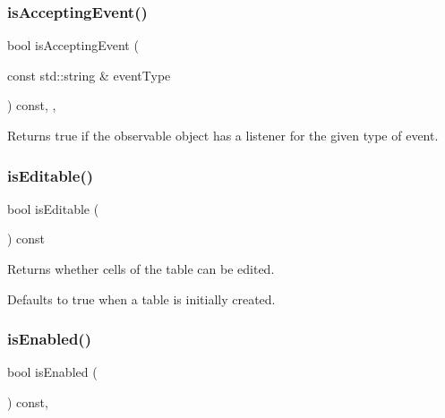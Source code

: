 \subsubsection{\texorpdfstring{is\+Accepting\+Event()}{isAcceptingEvent()}\hspace{0.1cm}{\footnotesize\ttfamily [3/3]}}
{\footnotesize\ttfamily bool is\+Accepting\+Event (\begin{DoxyParamCaption}\item[{const std\+::string \&}]{event\+Type }\end{DoxyParamCaption}) const\hspace{0.3cm}{\ttfamily [protected]}, {\ttfamily [virtual]}, {\ttfamily [inherited]}}



Returns true if the observable object has a listener for the given type of event. 

\mbox{\label{classGTable_a012b5afb54e037e6c5498cf0932a521b}} 
\subsubsection{\texorpdfstring{is\+Editable()}{isEditable()}}
{\footnotesize\ttfamily bool is\+Editable (\begin{DoxyParamCaption}{ }\end{DoxyParamCaption}) const\hspace{0.3cm}{\ttfamily [virtual]}}



Returns whether cells of the table can be edited. 

Defaults to true when a table is initially created. \mbox{\label{classGInteractor_aacb819fb241851fd9fc045271baa4034}} 
\subsubsection{\texorpdfstring{is\+Enabled()}{isEnabled()}}
{\footnotesize\ttfamily bool is\+Enabled (\begin{DoxyParamCaption}{ }\end{DoxyParamCaption}) const\hspace{0.3cm}{\ttfamily [virtual]}, {\ttfamily [inherited]}}



